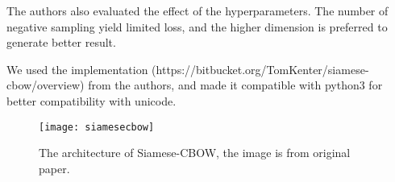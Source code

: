 The authors also evaluated the effect of the hyperparameters. The number of negative sampling yield limited loss, and the higher dimension is preferred to generate better result.

We used the implementation (https://bitbucket.org/TomKenter/siamese-cbow/overview) from the authors, and made it compatible with python3 for better compatibility with unicode.

\begin{figure}[h]
    \centering
	\texttt{[image: siamesecbow]}
    \caption{The architecture of Siamese-CBOW, the image is from original paper\cite{kenter2016siamesecbow}.}
    \label{fig:siamese}
\end{figure}
